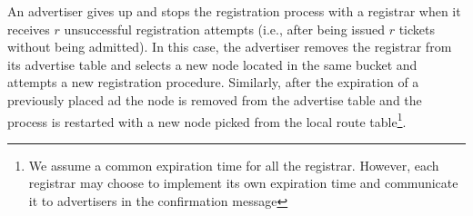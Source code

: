 An advertiser gives up and stops the registration process with a registrar when
it receives $r$ unsuccessful registration attempts (i.e., after being issued $r$
tickets without being admitted). In this case, the advertiser removes the registrar from its advertise table and selects a new node located in the same bucket and attempts a new registration procedure.
Similarly,  after the expiration of a previously placed ad the node is removed from the advertise table and the process is restarted with a new node picked from the local route table\footnote{We assume a common expiration time for all the registrar. However, each registrar may choose to implement its own expiration time and communicate it to advertisers in the confirmation message}.
